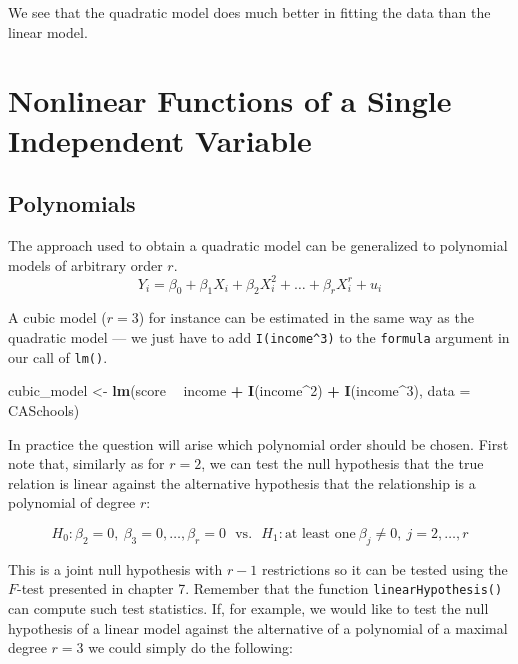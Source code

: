 \documentclass[]{book}
\newenvironment{Shaded}{\begin{snugshade}}{\end{snugshade}}
\newcommand{\KeywordTok}[1]{\textcolor[rgb]{0.13,0.29,0.53}{\textbf{#1}}}
\newcommand{\DataTypeTok}[1]{\textcolor[rgb]{0.13,0.29,0.53}{#1}}
\newcommand{\DecValTok}[1]{\textcolor[rgb]{0.00,0.00,0.81}{#1}}
\newcommand{\StringTok}[1]{\textcolor[rgb]{0.31,0.60,0.02}{#1}}
\newcommand{\OperatorTok}[1]{\textcolor[rgb]{0.81,0.36,0.00}{\textbf{#1}}}
\newcommand{\NormalTok}[1]{#1}
\theoremstyle{definition}
\theoremstyle{definition}
\theoremstyle{definition}
\theoremstyle{remark}
\begin{document}
We see that the quadratic model does much better in fitting the data
than the linear model.

\section{Nonlinear Functions of a Single Independent
Variable}\label{nonlinear-functions-of-a-single-independent-variable}

\subsection*{Polynomials}\label{polynomials}

The approach used to obtain a quadratic model can be generalized to
polynomial models of arbitrary order \(r\).
\[Y_i = \beta_0 + \beta_1 X_i + \beta_2 X_i^2 + \ldots + \beta_r X_i^r + u_i\]

A cubic model (\(r=3\)) for instance can be estimated in the same way as
the quadratic model --- we just have to add \texttt{I(income\^{}3)} to
the \texttt{formula} argument in our call of \texttt{lm()}.

\begin{Shaded}
\begin{Highlighting}[]
\NormalTok{cubic_model <-}\StringTok{ }\KeywordTok{lm}\NormalTok{(score }\OperatorTok{~}\StringTok{ }\NormalTok{income }\OperatorTok{+}\StringTok{ }\KeywordTok{I}\NormalTok{(income}\OperatorTok{^}\DecValTok{2}\NormalTok{) }\OperatorTok{+}\StringTok{ }\KeywordTok{I}\NormalTok{(income}\OperatorTok{^}\DecValTok{3}\NormalTok{), }\DataTypeTok{data =}\NormalTok{ CASchools)}
\end{Highlighting}
\end{Shaded}

In practice the question will arise which polynomial order should be
chosen. First note that, similarly as for \(r=2\), we can test the null
hypothesis that the true relation is linear against the alternative
hypothesis that the relationship is a polynomial of degree \(r\):

\[ H_0: \beta_2=0, \ \beta_3=0,\dots,\beta_r=0 \ \ \ \text{vs.} \ \ \ H_1: \text{at least one} \ \beta_j\neq0, \ j=2,\dots,r \]

This is a joint null hypothesis with \(r-1\) restrictions so it can be
tested using the \(F\)-test presented in chapter 7. Remember that the
function \texttt{linearHypothesis()} can compute such test statistics.
If, for example, we would like to test the null hypothesis of a linear
model against the alternative of a polynomial of a maximal degree
\(r=3\) we could simply do the following:
\end{document}
